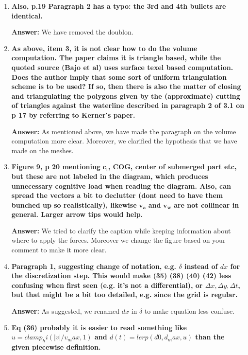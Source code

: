 \documentclass{article}
\newcommand{\answer}[1]{\textbf{\textcolor{answercolor}{Answer:}} \textcolor{answercolor}{#1}}
\begin{document}
\begin{enumerate}[label=\textbf{\arabic*.}]
	      \answer{We have merge the two sections to remove redundancy.}

	\item \textbf{Also, p.19 Paragraph 2 has a typo: the 3rd and 4th bullets are identical.}

	      \answer{We have removed the doublon.}

	\item \textbf{As above, item 3, it is not clear how to do the volume computation. The paper claims it is triangle based, while the quoted source (Bajo et al) uses surface texel based computation. Does the author imply that some sort of uniform triangulation scheme is to be used? If so, then there is also the matter of closing and triangulating the polygons given by the (approximate) cutting of triangles against the waterline described in paragraph 2 of 3.1 on p 17 by referring to Kerner's paper.}

	      \answer{As mentioned above, we have made the paragraph on the volume computation more clear. Moreover, we clarified the hypothesis that we have made on the meshes.}


	\item \textbf{Figure 9, p 20 mentioning }$\mathbf{c_i}$\textbf{, COG, center of submerged part etc, but these are not labeled in the diagram, which produces unnecessary cognitive load when reading the diagram. Also, can spread the vectors a bit to declutter (dont need to have them bunched up so realistically), likewise }$\mathbf{v_a}$\textbf{ and }$\mathbf{v_w}$\textbf{ are not collinear in general. Larger arrow tips would help.}

	      \answer{We tried to clarify the caption while keeping information about where to apply the forces. Moreover we change the figure based on your comment to make it more clear.}


	\item \textbf{ Paragraph 1, suggesting change of notation, e.g. $\delta$ instead of $dx$ for the discretization step. This would make (35) (38) (40) (42) less confusing when first seen (e.g. it's not a differential), or $\Delta{x}, \Delta{y}, \Delta{t}$, but that might be a bit too detailed, e.g. since the grid is regular.}

	      \answer{As suggested, we renamed $dx$ in $\delta$ to make equation less confuse.}

	\item \textbf{Eq (36)  probably it is easier to read something like $u = clamp_hi(|v|/v_max, 1)$ and $d(t) = lerp(d0, d_max, u)$ than the given piecewise definition.}


\end{enumerate}
\end{document}
